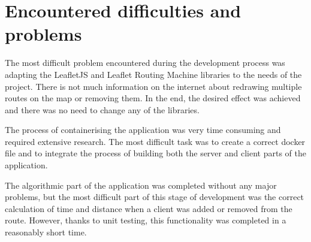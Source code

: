 \documentclass[a4paper,twoside,12pt]{book}
\newcounter{PagesWithoutNumbers}
\begin{document}
\section{Encountered difficulties and problems}
The most difficult problem encountered during the development process was adapting the LeafletJS and Leaflet Routing Machine libraries to the needs of the project. There is not much information on the internet about redrawing multiple routes on the map or removing them. In the end, the desired effect was achieved and there was no need to change any of the libraries. 

The process of containerising the application was very time consuming and required extensive research. The most difficult task was to create a correct docker file and to integrate the process of building both the server and client parts of the application.

The algorithmic part of the application was completed without any major problems, but the most difficult part of this stage of development was the correct calculation of time and distance when a client was added or removed from the route. However, thanks to unit testing, this functionality was completed in a reasonably short time.

 

 


\backmatter
{}
\setcounter{page}{\value{PagesWithoutNumbers}}

\pagestyle{onlyPageNumbers}

%
%

\printbibliography
\end{document}
